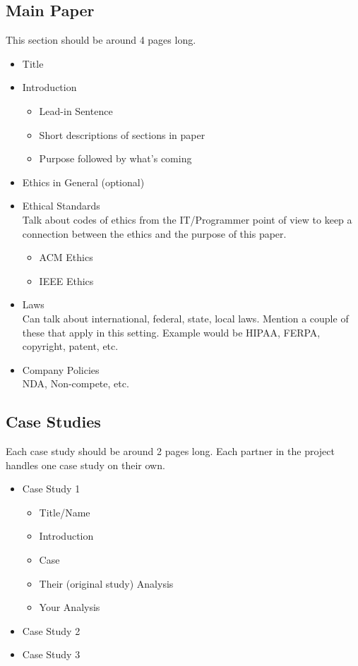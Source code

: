 \documentclass{report}
\begin{document}
\subsection{Main Paper}
This section should be around 4 pages long.
\begin{itemize}
\item Title
\item Introduction
	\begin{itemize}
	\item Lead-in Sentence
	\item Short descriptions of sections in paper
	\item Purpose followed by what's coming	
	\end{itemize}

\item Ethics in General (optional)
\item Ethical Standards\\
	Talk about codes of ethics from the IT/Programmer point of view to keep a connection between the ethics and the purpose of this paper.
	\begin{itemize}
	\item ACM Ethics
	\item IEEE Ethics
	\end{itemize}
\item Laws\\
	Can talk about international, federal, state, local laws. Mention a couple of these that apply in this setting. Example would be HIPAA, FERPA, copyright, patent, etc.
\item Company Policies\\
	NDA, Non-compete, etc.
\end{itemize}
\subsection{Case Studies}
Each case study should be around 2 pages long. Each partner in the project handles one case study on their own.
\begin{itemize}
\item Case Study 1
	\begin{itemize}
	\item Title/Name
	\item Introduction
	\item Case
	\item Their (original study) Analysis
	\item Your Analysis
	\end{itemize}
\item Case Study 2
\item Case Study 3
\end{itemize}
\end{document}
